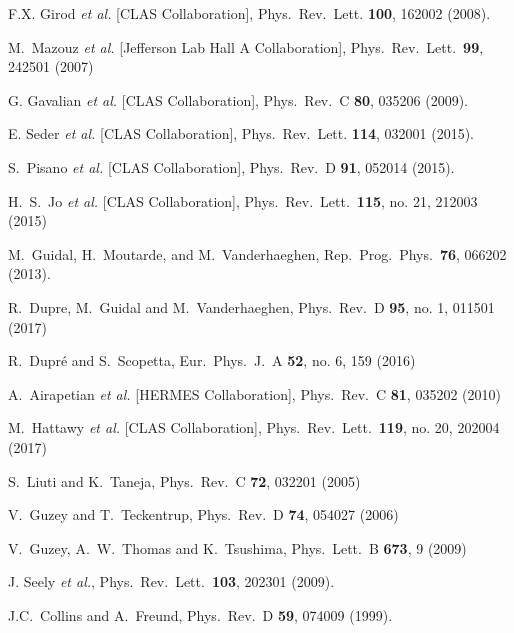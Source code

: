 \documentclass[twocolumn,nofootinbib,showpacs,prl,superscriptaddress,secnumarabic,amssymb,nobibnotes,aps,floatfix]{revtex4}
\begin{document}
\begin{thebibliography}{99}
F.X. Girod {\it et al.} [CLAS Collaboration],
Phys.\ Rev.\ Lett. {\bf 100}, 162002 (2008).

   M.~Mazouz {\it et al.} [Jefferson Lab Hall A Collaboration],
   Phys.\ Rev.\ Lett.\  {\bf 99}, 242501 (2007)

G. Gavalian {\it et al.} [CLAS Collaboration],
Phys.\ Rev.\ C {\bf 80}, 035206 (2009).

E. Seder {\it et al.} [CLAS Collaboration],
Phys.\ Rev.\ Lett. {\bf 114}, 032001 (2015).

S.~Pisano {\it et al.} [CLAS Collaboration],
Phys.\ Rev.\ D {\bf 91}, 052014 (2015).

 H.~S.~Jo {\it et al.} [CLAS Collaboration],
  Phys.\ Rev.\ Lett.\  {\bf 115}, no. 21, 212003 (2015)

 M.~Guidal, H.~Moutarde, and M.~Vanderhaeghen,
Rep.\ Prog.\ Phys.\  {\bf 76}, 066202 (2013).

 R.~Dupre, M.~Guidal and M.~Vanderhaeghen,
 Phys.\ Rev.\ D {\bf 95}, no. 1, 011501 (2017)

  R.~Dupré and S.~Scopetta,
  Eur.\ Phys.\ J.\ A {\bf 52}, no. 6, 159 (2016)

 A.~Airapetian {\it et al.} [HERMES Collaboration],
Phys.\ Rev.\ C {\bf 81}, 035202 (2010)

   M.~Hattawy {\it et al.} [CLAS Collaboration],
   Phys.\ Rev.\ Lett.\  {\bf 119}, no. 20, 202004 (2017)


S.~Liuti and K.~Taneja, Phys.\ Rev.\ C {\bf 72}, 032201 (2005)

 V.~Guzey and T.~Teckentrup, Phys.\ Rev.\ D {\bf 74}, 
   054027 (2006)

 V.~Guzey, A.~W.~Thomas and K.~Tsushima,
  Phys.\ Lett.\ B {\bf 673}, 9 (2009)

J. Seely {\it et al.}, Phys.\ Rev.\ Lett.\ {\bf 103}, 202301 (2009).


J.C.~Collins and A.~Freund, Phys.\ Rev.\ D {\bf 59}, 074009 (1999).


\end{thebibliography}
\end{document}
